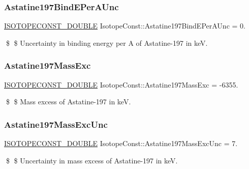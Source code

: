 \subsubsection{\texorpdfstring{Astatine197\+Bind\+E\+Per\+A\+Unc}{Astatine197BindEPerAUnc}}
{\footnotesize\ttfamily \mbox{\hyperlink{group___isotope_const-_macros_ga8f45a7272ce02c0b4c65c44636ed719a}{I\+S\+O\+T\+O\+P\+E\+C\+O\+N\+S\+T\+\_\+\+D\+O\+U\+B\+LE}} Isotope\+Const\+::\+Astatine197\+Bind\+E\+Per\+A\+Unc = 0.}

\$ \$ Uncertainty in binding energy per A of Astatine-\/197 in keV. \mbox{\label{group___isotope_const-_astatine-_at197_gafe84b3266d937c8e0de33dac1443ae9a}} 
\subsubsection{\texorpdfstring{Astatine197\+Mass\+Exc}{Astatine197MassExc}}
{\footnotesize\ttfamily \mbox{\hyperlink{group___isotope_const-_macros_ga8f45a7272ce02c0b4c65c44636ed719a}{I\+S\+O\+T\+O\+P\+E\+C\+O\+N\+S\+T\+\_\+\+D\+O\+U\+B\+LE}} Isotope\+Const\+::\+Astatine197\+Mass\+Exc = -\/6355.}

\$ \$ Mass excess of Astatine-\/197 in keV. \mbox{\label{group___isotope_const-_astatine-_at197_ga74a44101696e18a4088b1a97d406f6f1}} 
\subsubsection{\texorpdfstring{Astatine197\+Mass\+Exc\+Unc}{Astatine197MassExcUnc}}
{\footnotesize\ttfamily \mbox{\hyperlink{group___isotope_const-_macros_ga8f45a7272ce02c0b4c65c44636ed719a}{I\+S\+O\+T\+O\+P\+E\+C\+O\+N\+S\+T\+\_\+\+D\+O\+U\+B\+LE}} Isotope\+Const\+::\+Astatine197\+Mass\+Exc\+Unc = 7.}

\$ \$ Uncertainty in mass excess of Astatine-\/197 in keV. \mbox{\label{group___isotope_const-_astatine-_at197_gae1aa217fe1a118cec003fd9e848a0c36}} 
